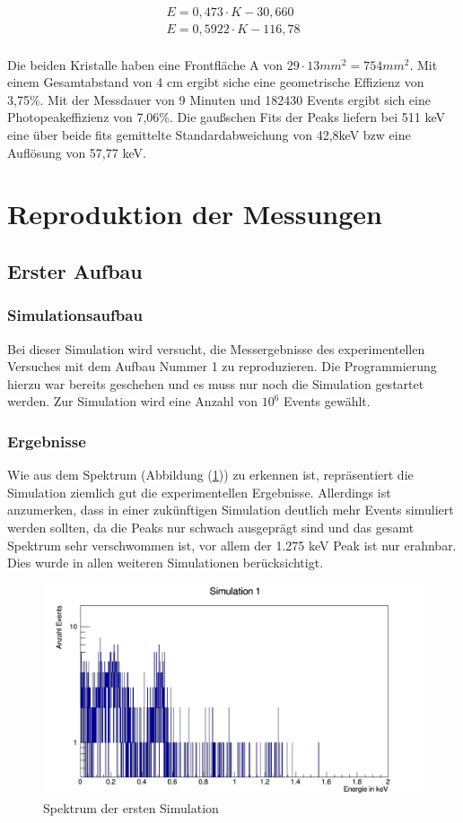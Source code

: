 \documentclass[a4paper,14pt,twoside]{article}
\begin{document}
\begin {align}
E=0,473\cdot K-30,660\\
E=0,5922\cdot K-116,78
\end{align}
\\
Die beiden Kristalle haben eine Frontfläche A von $29 \cdot 13 mm^2=754mm^2$. Mit einem Gesamtabstand von 4 cm ergibt siche eine geometrische Effizienz von 3,75\%. Mit der Messdauer von 9 Minuten und 182430 Events ergibt sich eine Photopeakeffizienz von 7,06\%.
Die gaußschen Fits der Peaks liefern bei 511 keV eine über beide fits gemittelte Standardabweichung von 42,8keV bzw eine Auflösung von 57,77 keV.


\section{Reproduktion der Messungen}
	\subsection{Erster Aufbau}
		\subsubsection{Simulationsaufbau}
		Bei dieser Simulation wird versucht, die Messergebnisse des experimentellen Versuches mit dem Aufbau Nummer 1 zu reproduzieren. Die Programmierung hierzu war bereits geschehen und es muss nur noch die Simulation gestartet werden. Zur Simulation wird eine Anzahl von $10^6$ Events gewählt. 
		
		
		\subsubsection{Ergebnisse}
		Wie aus dem Spektrum (Abbildung (\ref{S1_ganz})) zu erkennen ist, repräsentiert die Simulation ziemlich gut die experimentellen Ergebnisse. Allerdings ist anzumerken, dass in einer zukünftigen Simulation deutlich mehr Events simuliert werden sollten, da die Peaks nur schwach ausgeprägt sind und das gesamt Spektrum sehr verschwommen ist, vor allem der 1.275 keV Peak ist nur erahnbar. Dies wurde in allen weiteren Simulationen berücksichtigt. 
		
		 
\begin{figure}[H]
	\begin{center}
		\includegraphics[width=0.7\linewidth]{Simulation1_ganz}
		\caption{Spektrum der ersten Simulation}
		\label{S1_ganz}
	\end{center}
\end{figure}	
\end{document}
